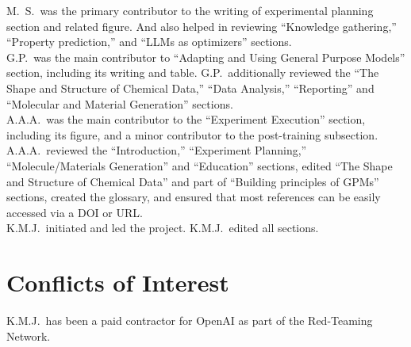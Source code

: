 \documentclass[11pt, oneside]{article}
\begin{document}
\noindent M.\ S.\ was the primary contributor to the writing of experimental planning section and related figure. And also helped in reviewing \enquote{Knowledge gathering,} \enquote{Property prediction,} and \enquote{LLMs as optimizers} sections. \\


\noindent G.P.\ was the main contributor to \enquote{Adapting and Using General Purpose Models} section, including its writing and table. G.P.\ additionally reviewed the \enquote{The Shape and Structure of Chemical Data,} \enquote{Data Analysis,} \enquote{Reporting} and \enquote{Molecular and Material Generation} sections. \\

\noindent A.A.A.\ was the main contributor to the \enquote{Experiment Execution} section, including its figure, and a minor contributor to the post-training subsection. A.A.A.\ reviewed the \enquote{Introduction,} \enquote{Experiment Planning,} \enquote{Molecule/Materials Generation} and \enquote{Education} sections, edited \enquote{The Shape and Structure of Chemical Data} and part of \enquote{Building principles of GPMs} sections, created the glossary, and ensured that most references can be easily accessed via a DOI or URL. \\

\noindent K.M.J.\ initiated and led the project. K.M.J.\ edited all sections. 

\section*{Conflicts of Interest}
K.M.J.\ has been a paid contractor for OpenAI as part of the Red-Teaming Network.

\clearpage
\printbibliography

\clearpage
\glsaddall
\printnoidxglossary[type=\acronymtype, sort=letter]
\printnoidxglossary[type=main, title=Glossary]
\end{document}
